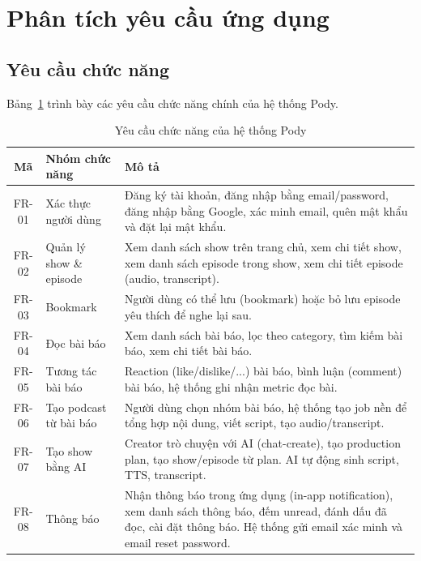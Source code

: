 \documentclass[14pt,a4paper,oneside]{extreport}
\begin{document}
\section{Phân tích yêu cầu ứng dụng}
\label{sec:yeu-cau}

\subsection{Yêu cầu chức năng}
\label{subsec:yeu-cau-cn}

Bảng~\ref{tab:yeu-cau-cn} trình bày các yêu cầu chức năng chính của hệ thống Pody.

\begin{table}[H]
\centering
\caption{Yêu cầu chức năng của hệ thống Pody}
\label{tab:yeu-cau-cn}
\renewcommand{\arraystretch}{1.3}
\small
\begin{tabularx}{\textwidth}{|c|l|X|}
\hline
\textbf{Mã} & \textbf{Nhóm chức năng} & \textbf{Mô tả} \\
\hline
FR-01 & Xác thực người dùng &
  Đăng ký tài khoản, đăng nhập bằng email/password, đăng nhập bằng Google, xác minh email, quên mật khẩu và đặt lại mật khẩu. \\
\hline
FR-02 & Quản lý show \& episode &
  Xem danh sách show trên trang chủ, xem chi tiết show, xem danh sách episode trong show, xem chi tiết episode (audio, transcript). \\
\hline
FR-03 & Bookmark &
  Người dùng có thể lưu (bookmark) hoặc bỏ lưu episode yêu thích để nghe lại sau. \\
\hline
FR-04 & Đọc bài báo &
  Xem danh sách bài báo, lọc theo category, tìm kiếm bài báo, xem chi tiết bài báo. \\
\hline
FR-05 & Tương tác bài báo &
  Reaction (like/dislike/...) bài báo, bình luận (comment) bài báo, hệ thống ghi nhận metric đọc bài. \\
\hline
FR-06 & Tạo podcast từ bài báo &
  Người dùng chọn nhóm bài báo, hệ thống tạo job nền để tổng hợp nội dung, viết script, tạo audio/transcript. \\
\hline
FR-07 & Tạo show bằng AI &
  Creator trò chuyện với AI (chat-create), tạo production plan, tạo show/episode từ plan. AI tự động sinh script, TTS, transcript. \\
\hline
FR-08 & Thông báo &
  Nhận thông báo trong ứng dụng (in-app notification), xem danh sách thông báo, đếm unread, đánh dấu đã đọc, cài đặt thông báo. Hệ thống gửi email xác minh và email reset password. \\
\hline
\end{tabularx}
\end{table}
\end{document}
